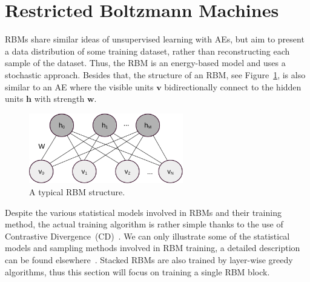 \section{Restricted Boltzmann Machines}
\label{sec:rbm}
RBMs share similar ideas of unsupervised learning with AEs, but aim to present a data distribution of some training dataset, rather than reconstructing each sample of the dataset.
Thus, the RBM is an energy-based model and uses a stochastic approach.
Besides that, the structure of an RBM, see Figure~\ref{fig:RBM}, is also similar to an AE where the visible units $\mathbf{v}$ bidirectionally connect to the hidden units $\mathbf{h}$ with strength $\mathbf{w}$.


\begin{figure}[hbt]
	\centering
	\includegraphics[width=0.6\textwidth]{pics_sdlm/rbm_o.pdf}
	\caption{A typical RBM structure.}
	\label{fig:RBM}
\end{figure}

Despite the various statistical models involved in RBMs and their training method, the actual training algorithm is rather simple thanks to the use of Contrastive Divergence~(CD)~\citep{hinton2002training}.
We can only illustrate some of the statistical models and sampling methods involved in RBM training, a detailed description can be found elsewhere~\citep{fischer2012introduction}. 
Stacked RBMs are also trained by layer-wise greedy algorithms, thus this section will focus on training a single RBM block.

